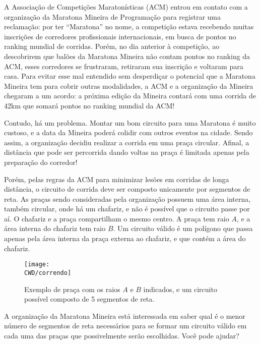 A Associação de Competições Maratonísticas (ACM) entrou em contato com a organização da Maratona Mineira de Programação para registrar uma reclamação:
por ter ``Maratona'' no nome, a competição estava recebendo muitas inscrições de corredores profissionais internacionais, em busca de pontos no
ranking mundial de corridas. Porém, no dia anterior à competição,
ao descobrirem que balões da Maratona Mineira não contam pontos no ranking da ACM, esses corredores se frustraram, retiraram
sua inscrição e voltaram para casa.
Para evitar esse mal entendido sem desperdiçar o potencial que a Maratona Mineira tem para cobrir outras modalidades,
a ACM e a organização da Mineira chegaram
a um acordo: a próxima edição da Mineira contará com uma corrida de 42km que somará pontos no ranking mundial da ACM!

Contudo, há um problema. Montar um bom circuito para uma Maratona é muito custoso, e a data da Mineira poderá colidir
com outros eventos na cidade. Sendo assim, a organização decidiu realizar a corrida em uma praça circular. Afinal, a distância que
pode ser percorrida dando voltas na praça é limitada apenas pela preparação do corredor!

Porém, pelas regras da ACM para minimizar lesões em corridas de longa distância, o circuito de corrida deve ser composto
unicamente por segmentos de reta.
As praças sendo consideradas pela organização possuem uma área interna, também circular, onde há um chafariz, e não é possível que o circuito
passe por aí. O chafariz e a praça compartilham o mesmo centro.
A praça tem raio $A$, e a área interna do chafariz tem raio $B$. Um circuito válido é um polígono que passa apenas pela área interna
da praça externa ao chafariz, e que contém a área do chafariz.

\begin{figure}[h]
\begin{center}
\texttt{[image: \\CWD/correndo]}
\begin{quote}
\caption{Exemplo de praça com os raios $A$ e $B$ indicados, e um circuito possível composto de 5 segmentos de reta.}
\end{quote}
\end{center}
\end{figure}

A organização da Maratona Mineira está interessada em saber qual é o menor número de segmentos de reta necessários para se formar um circuito
válido em cada uma das praças que possivelmente serão escolhidas. Você pode ajudar?

